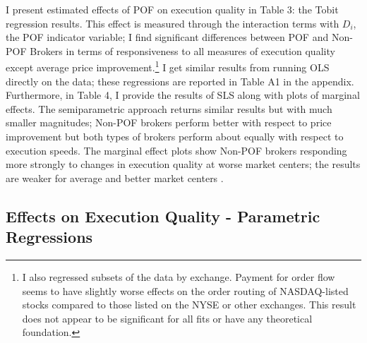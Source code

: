 \documentclass[12pt,a4paper]{article}
\begin{document}
	 I present estimated effects of POF on execution quality in Table 3: the Tobit regression results. This effect is measured through the interaction terms with $D_i$, the POF indicator variable; I find significant differences between POF and Non-POF Brokers in terms of responsiveness to all measures of execution quality except average price improvement.\footnote{I also regressed subsets of the data by exchange. Payment for order flow seems to have slightly worse effects on the order routing of NASDAQ-listed stocks compared to those listed on the NYSE or other exchanges. This result does not appear to be significant for all fits or have any theoretical foundation.}  I get similar results from running OLS directly on the data; these regressions are reported in Table A1 in the appendix. Furthermore, in Table 4, I provide the results of SLS along with plots of marginal effects. The semiparametric approach returns similar results but with much smaller magnitudes; Non-POF brokers perform better with respect to price improvement but both types of brokers perform about equally with respect to execution speeds. The marginal effect plots show Non-POF brokers responding more strongly to changes in execution quality at worse market centers; the results are weaker for average and better market centers . 



\subsection{Effects on Execution Quality - Parametric Regressions}
\end{document}
